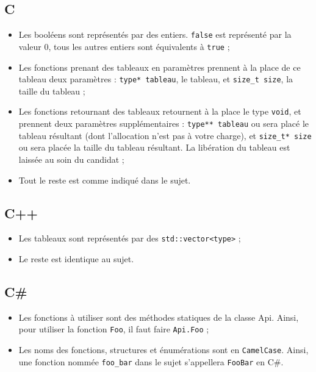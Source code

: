 \subsection{C}

\begin{itemize}
\item{Les booléens sont représentés par des entiers. \texttt{false} est
      représenté par la valeur 0, tous les autres entiers sont équivalents
      à \texttt{true} ;}
\item{Les fonctions prenant des tableaux en paramètres prennent à la place
      de ce tableau deux paramètres : \texttt{type* tableau}, le tableau,
      et \texttt{size\_t size}, la taille du tableau ;}
\item{Les fonctions retournant des tableaux retournent à la place le type
      \texttt{void}, et prennent deux paramètres supplémentaires :
      \texttt{type** tableau} ou sera placé le tableau résultant (dont
      l'allocation n'est pas à votre charge), et \texttt{size\_t* size} ou
      sera placée la taille du tableau résultant. La libération du tableau
      est laissée au soin du candidat ;}
\item{Tout le reste est comme indiqué dans le sujet.}
\end{itemize}

\subsection{C++}

\begin{itemize}
\item{Les tableaux sont représentés par des \texttt{std::vector<type>} ;}
\item{Le reste est identique au sujet.}
\end{itemize}

\subsection{C\#}

\begin{itemize}
\item{Les fonctions à utiliser sont des méthodes statiques de la classe Api.
      Ainsi, pour utiliser la fonction \texttt{Foo}, il faut faire
      \texttt{Api.Foo} ;}
\item{Les noms des fonctions, structures et énumérations sont en
      \texttt{CamelCase}. Ainsi, une fonction nommée \texttt{foo\_bar} dans
      le sujet s'appellera \texttt{FooBar} en C\#.}
\end{itemize}

